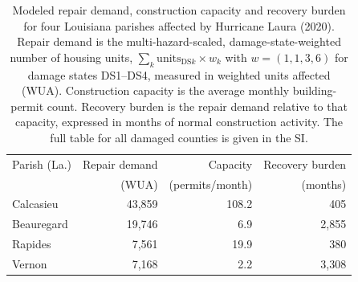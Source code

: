 \begin{table}[htb!]
\centering
\caption{Modeled repair demand, construction capacity and recovery burden for
four Louisiana parishes affected by Hurricane Laura (2020). Repair demand is
the multi-hazard-scaled, damage-state-weighted number of housing units,
$\sum_k \mathrm{units}_{\mathrm{DS}k} \times w_k$ with
$w = (1, 1, 3, 6)$ for damage states DS1--DS4, measured in weighted units
affected (WUA). Construction capacity is the average monthly building-permit
count. Recovery burden is the repair demand relative to that capacity,
expressed in months of normal construction activity. The full table for all
damaged counties is given in the SI.}
\label{tab:laura_counties}
\begin{tabular}{lrrr}
\hline
Parish (La.) & Repair demand & Capacity & Recovery burden \\
 & (WUA) & (permits/month) & (months) \\
\hline
Calcasieu & 43,859 & 108.2 & 405 \\
Beauregard & 19,746 & 6.9 & 2,855 \\
Rapides & 7,561 & 19.9 & 380 \\
Vernon & 7,168 & 2.2 & 3,308 \\
\hline
\end{tabular}
\end{table}
